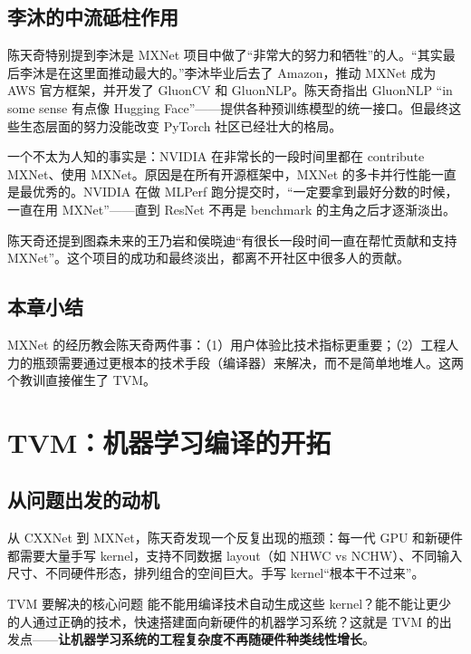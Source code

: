 \documentclass[a4paper]{article}
\begin{document}
\subsection{李沐的中流砥柱作用}

陈天奇特别提到李沐是 MXNet 项目中做了``非常大的努力和牺牲''的人。``其实最后李沐是在这里面推动最大的。''李沐毕业后去了 Amazon，推动 MXNet 成为 AWS 官方框架，并开发了 GluonCV 和 GluonNLP。陈天奇指出 GluonNLP ``in some sense 有点像 Hugging Face''------提供各种预训练模型的统一接口。但最终这些生态层面的努力没能改变 PyTorch 社区已经壮大的格局。

一个不太为人知的事实是：NVIDIA 在非常长的一段时间里都在 contribute MXNet、使用 MXNet。原因是在所有开源框架中，MXNet 的多卡并行性能一直是最优秀的。NVIDIA 在做 MLPerf 跑分提交时，``一定要拿到最好分数的时候，一直在用 MXNet''------直到 ResNet 不再是 benchmark 的主角之后才逐渐淡出。

陈天奇还提到图森未来的王乃岩和侯晓迪``有很长一段时间一直在帮忙贡献和支持 MXNet''。这个项目的成功和最终淡出，都离不开社区中很多人的贡献。

\subsection{本章小结}

MXNet 的经历教会陈天奇两件事：（1）用户体验比技术指标更重要；（2）工程人力的瓶颈需要通过更根本的技术手段（编译器）来解决，而不是简单地堆人。这两个教训直接催生了 TVM。

\section{TVM：机器学习编译的开拓}

\subsection{从问题出发的动机}

从 CXXNet 到 MXNet，陈天奇发现一个反复出现的瓶颈：每一代 GPU 和新硬件都需要大量手写 kernel，支持不同数据 layout（如 NHWC vs NCHW）、不同输入尺寸、不同硬件形态，排列组合的空间巨大。手写 kernel``根本干不过来''。

\begin{importantbox}{TVM 要解决的核心问题}
能不能用编译技术自动生成这些 kernel？能不能让更少的人通过正确的技术，快速搭建面向新硬件的机器学习系统？这就是 TVM 的出发点------\textbf{让机器学习系统的工程复杂度不再随硬件种类线性增长}。
\end{importantbox}
\end{document}
